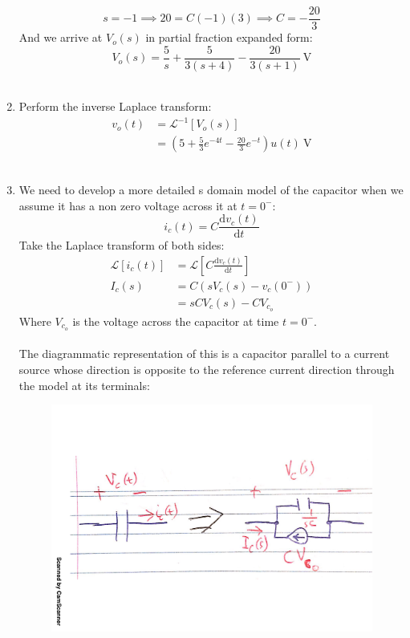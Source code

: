 \begin{enumerate}
{\begin{equation*}
			s = -1 \implies 20 = C(-1)(3) \implies C = -\frac{20}{3}
		\end{equation*}
		And we arrive at $V_o(s)$ in partial fraction expanded form:
		\begin{equation*}
			V_o(s) = \frac{5}{s} + \frac{5}{3(s+4)} - \frac{20}{3(s+1)} \ \mathrm{V}
		\end{equation*}
		\\
	}
	\item{
		Perform the inverse Laplace transform:
		\begin{align*}
			v_o(t) &= \mathcal{L}^{-1}\left[ V_o(s) \right] \\
			&= \left(5 + \frac{5}{3}e^{-4t} - \frac{20}{3}e^{-t} \right) u(t) \ \mathrm{V}
		\end{align*}
		\\
	}
	\item{
		We need to develop a more detailed s domain model of the capacitor when we assume it has a non zero voltage across it at $t=0^-$:
		\begin{equation*}
			i_c(t) = C \frac{\mathrm{d}v_c(t)}{\mathrm{d}t}
		\end{equation*}
		Take the Laplace transform of both sides:
		\begin{align*}
			\mathcal{L} \left[i_c(t) \right] &= \mathcal{L} \left[C \frac{\mathrm{d}v_c(t)}{\mathrm{d}t} \right] \\
			I_c(s) &= C \left(sV_c(s) - v_c (0^-) \right) \\
			&= sCV_c(s) - CV_{c_o}
		\end{align*}
		Where $V_{c_o}$ is the voltage across the capacitor at time $t=0^-$.
		\\ \\
		The diagrammatic representation of this is a capacitor parallel to a current source whose direction is opposite to the reference current direction through the model at its terminals:
		\begin{figure}[H]
			\centering
			\includegraphics[scale=0.5]{q2c1.pdf}

\end{figure}}
\end{enumerate}
